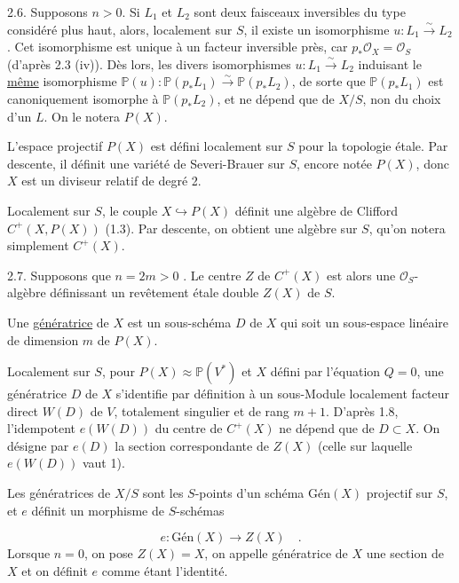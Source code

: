 2.6. Supposons $n > 0$. Si $L_1$ et $L_2$ sont deux faisceaux inversibles du type considéré plus haut, alors, localement sur $S$, il existe un isomorphisme $u : L_1 \stackrel{\sim}{\longrightarrow} L_2$. Cet isomorphisme est unique à un facteur inversible près, car $p_*\mathcal{O}_X = \mathcal{O}_S$ (d'après 2.3 (iv)). Dès lors, les divers isomorphismes $u : L_1 \stackrel{\sim}{\longrightarrow} L_2$ induisant le \underline{même} isomorphisme $\mathbb{P}(u): \mathbb{P}(p_*L_1) \stackrel{\sim}{\longrightarrow} \mathbb{P}(p_*L_2)$, de sorte que $\mathbb{P}(p_*L_1)$ est canoniquement isomorphe à $\mathbb{P}(p_*L_2)$, et ne dépend que de $X/S$, non du choix d'un $L$. On le notera $P(X)$.



L'espace projectif $P(X)$ est défini localement sur $S$ pour la topologie étale. Par descente, il définit une variété de Severi-Brauer sur $S$, encore notée $P(X)$, donc $X$ est un diviseur relatif de degré 2.

Localement sur $S$, le couple $X \hookrightarrow P(X)$ définit une algèbre de Clifford $C^+(X, P(X))$ (1.3). Par descente, on obtient une algèbre sur $S$, qu'on notera simplement $C^+(X)$.

2.7. Supposons que $n = 2m > 0$ . Le centre $Z$ de $C^+(X)$ est alors une $\mathcal{O}_S$-algèbre définissant un revêtement étale double $Z(X)$ de $S$.

Une \underline{génératrice} de $X$ est un sous-schéma $D$ de $X$ qui soit un sous-espace linéaire de dimension $m$ de $P(X)$.

Localement sur $S$, pour $P(X) \approx \mathbb{P}(V^*)$ et $X$ défini par l'équation $Q = 0$, une génératrice $D$ de $X$ s'identifie par définition à un sous-Module localement facteur direct $W(D)$ de $V$, totalement singulier et de rang $m + 1$. D'après 1.8, l'idempotent $e(W(D))$ du centre de $C^+(X)$ ne dépend que de $D \subset X$. On désigne par $e(D)$ la section correspondante de $Z(X)$ (celle sur laquelle $e(W(D))$ vaut 1).

Les génératrices de $X/S$ sont les $S$-points d'un schéma $\mbox{Gén}(X)$ projectif sur $S$, et $e$ définit un morphisme de $S$-schémas

\begin{equation}\tag{2.7.1}
e : \mbox{Gén}(X) \longrightarrow Z(X) \quad .
\end{equation}
Lorsque $n = 0$, on pose $Z(X) = X$, on appelle génératrice de $X$ une section de $X$ et on définit $e$ comme étant l'identité.


